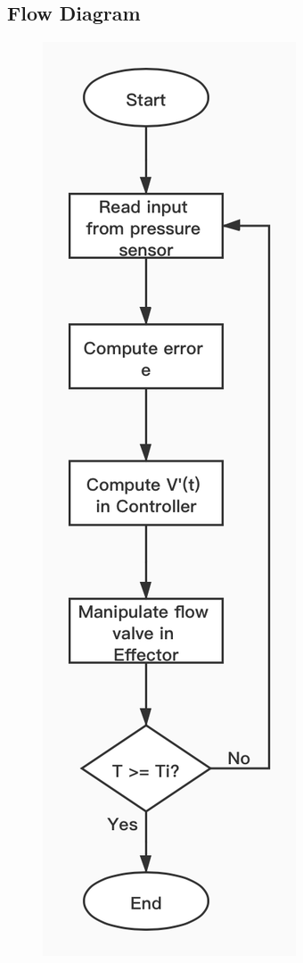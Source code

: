 \documentclass{article}
\begin{document}
\subsection{Flow Diagram}
\begin{figure}[h]
\centering
\includegraphics[scale=0.3]{flow-diagram.jpg}
\end{figure}
\end{document}
